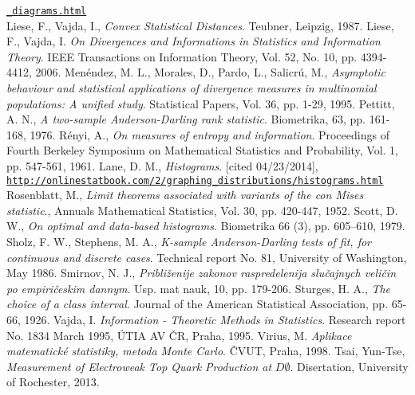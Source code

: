 \begin{thebibliography}{10}
\href{http://www-d0.fnal.gov/Run2Physics/top/top_public_web_pages/top_feynman_diagrams.html}{\texttt{\_diagrams.html}}\\
Liese, F., Vajda, I., {\em Convex Statistical Distances}. Teubner, Leipzig, 1987.
Liese, F., Vajda, I. {\em On Divergences and Informations in Statistics and Information Theory}. IEEE Transactions on Information Theory, Vol. 52, No. 10, pp. 4394-4412, 2006.
 Men\'endez, M. L., Morales, D., Pardo, L., Salicr\'u, M., {\em Asymptotic behaviour and statistical applications of divergence measures in multinomial populations: A unified study}. Statistical Papers, Vol. 36, pp. 1-29, 1995.
Pettitt, A. N., {\em A two-sample Anderson-Darling rank statistic}. Biometrika, 63, pp. 161-168, 1976.
 R\'enyi, A., {\em On measures of entropy and information}. Proceedings of Fourth Berkeley Symposium on Mathematical Statistics and Probability, Vol. 1, pp. 547-561, 1961.
 Lane, D. M., {\em Histograms}. [cited 04/23/2014], \\
\href{http://onlinestatbook.com/2/graphing_distributions/histograms.html}{\texttt{http://onlinestatbook.com/2/graphing\_distributions/histograms.html}}
 Rosenblatt, M., {\em Limit theorems associated with variants of the con Mises statistic}., Annuals Mathematical Statistics, Vol. 30, pp. 420-447, 1952.
 Scott, D. W., {\em On optimal and data-based histograms}. Biometrika 66 (3), pp. 605–610, 1979.
 Sholz, F. W., Stephens, M. A., {\em K-sample Anderson-Darling tests of fit, for continuous and discrete cases}. Technical report No. 81, University of Washington, May 1986.
Smirnov, N. J., {\em Pribli\v{z}enije zakonov raspredelenija slu\v{c}ajnych veli\v{c}in po empiri\v{c}eskim dannym}. Usp. mat nauk, 10, pp. 179-206.
 Sturges, H. A., {\em The choice of a class interval}. Journal of the American Statistical Association, pp. 65-66, 1926.
Vajda, I. {\em Information - Theoretic Methods in Statistics}. Research report No. 1834 March 1995, \'{U}TIA AV \v{C}R, Praha, 1995.
Virius, M. {\em Aplikace matematick\'e statistiky, metoda Monte Carlo}. \v{C}VUT, Praha, 1998.
Tsai, Yun-Tse, {\em Measurement of Electroweak Top Quark Production at} $D\mathit{\emptyset}$. Disertation, University of Rochester, 2013.
\end{thebibliography}